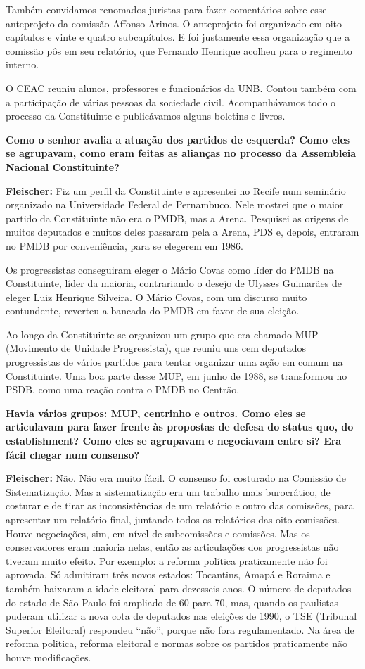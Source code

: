 Também convidamos renomados juristas para fazer comentários sobre esse
anteprojeto da comissão Affonso Arinos. O anteprojeto foi organizado em
oito capítulos e vinte e quatro subcapítulos. E foi justamente essa
organização que a comissão pôs em seu relatório, que Fernando Henrique
acolheu para o regimento interno.

O CEAC reuniu alunos, professores e funcionários da UNB. Contou também
com a participação de várias pessoas da sociedade civil. Acompanhávamos
todo o processo da Constituinte e publicávamos alguns boletins e livros.

\textbf{Como o senhor avalia a atuação dos partidos de esquerda? Como
eles se agrupavam, como eram feitas as alianças no processo da
Assembleia Nacional Constituinte?}

\textbf{Fleischer:} Fiz um perfil da Constituinte e apresentei no Recife
num seminário organizado na Universidade Federal de Pernambuco. Nele
mostrei que o maior partido da Constituinte não era o PMDB, mas a Arena.
Pesquisei as origens de muitos deputados e muitos deles passaram pela a
Arena, PDS e, depois, entraram no PMDB por conveniência, para se
elegerem em 1986.

Os progressistas conseguiram eleger o Mário Covas como líder do PMDB na
Constituinte, líder da maioria, contrariando o desejo de Ulysses
Guimarães de eleger Luiz Henrique Silveira. O Mário Covas, com um
discurso muito contundente, reverteu a bancada do PMDB em favor de sua
eleição.

Ao longo da Constituinte se organizou um grupo que era chamado MUP
(Movimento de Unidade Progressista), que reuniu uns cem deputados
progressistas de vários partidos para tentar organizar uma ação em comum
na Constituinte. Uma boa parte desse MUP, em junho de 1988, se
transformou no PSDB, como uma reação contra o PMDB no Centrão.

\textbf{Havia vários grupos: MUP, centrinho e outros. Como eles se
articulavam para fazer frente às propostas de defesa do status quo, do
establishment? Como eles se agrupavam e negociavam entre si? Era fácil
chegar num consenso?}

\textbf{Fleischer:} Não. Não era muito fácil. O consenso foi costurado
na Comissão de Sistematização. Mas a sistematização era um trabalho mais
burocrático, de costurar e de tirar as inconsistências de um relatório e
outro das comissões, para apresentar um relatório final, juntando todos
os relatórios das oito comissões. Houve negociações, sim, em nível de
subcomissões e comissões. Mas os conservadores eram maioria nelas, então
as articulações dos progressistas não tiveram muito efeito. Por exemplo:
a reforma política praticamente não foi aprovada. Só admitiram três
novos estados: Tocantins, Amapá e Roraima e também baixaram a idade
eleitoral para dezesseis anos. O número de deputados do estado de São
Paulo foi ampliado de 60 para 70, mas, quando os paulistas puderam
utilizar a nova cota de deputados nas eleições de 1990, o TSE (Tribunal
Superior Eleitoral) respondeu ``não'', porque não fora regulamentado. Na
área de reforma politica, reforma eleitoral e normas sobre os partidos
praticamente não houve modificações.

